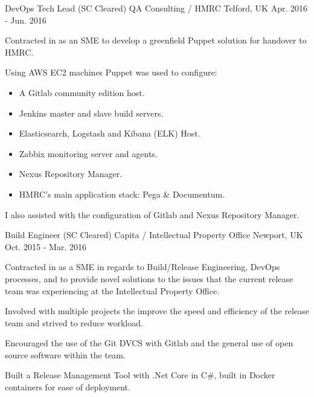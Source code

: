 \begin{cventries}
    \cventry
    {DevOps Tech Lead (SC Cleared)} %
    {QA Consulting / HMRC} %
    {Telford, UK} %
    {Apr. 2016 - Jun. 2016} %
    {
        \begin{cvitems} %
            \item {Contracted in as an SME to develop a greenfield Puppet solution for handover to HMRC.}
            \item {Using AWS EC2 machines Puppet was used to configure:}
            \begin{itemize}
                \item {A Gitlab community edition host.}
                \item {Jenkins master and slave build servers.}
                \item {Elasticsearch, Logstash and Kibana (ELK) Host.}
                \item {Zabbix monitoring server and agents.}
                \item {Nexus Repository Manager.}
                \item {HMRC's main application stack: Pega \& Documentum.}
            \end{itemize}
            \item {I also assisted with the configuration of Gitlab and Nexus Repository Manager.}
        \end{cvitems}
    }

  \cventry
    {Build Engineer (SC Cleared)} %
    {Capita / Intellectual Property Office} %
    {Newport, UK} %
    {Oct. 2015 - Mar. 2016} %
    {
        \begin{cvitems} %
            \item {Contracted in as a SME in regards to Build/Release Engineering, DevOps processes, and to provide novel solutions to the issues that the current release team was experiencing at the Intellectual Property Office.}
            \item {Involved with multiple projects the improve the speed and efficiency of the release team and strived to reduce workload.}
            \item {Encouraged the use of the Git DVCS with Gitlab and the general use of open source software within the team.}
            \item {Built a Release Management Tool with .Net Core in C\#, built in Docker containers for ease of deployment.}
        \end{cvitems}
    }


\end{cventries}
